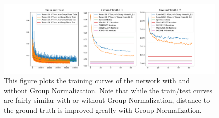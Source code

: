 \documentclass[10pt,twocolumn,letterpaper]{article}
\begin{document}
\begin{figure}[!hb]
\begin{center}
  \includegraphics[width=0.8\linewidth]{figures-GroupNormTest.pdf}
\end{center}
  \caption{
    This figure plots the training curves of the network with and without Group Normalization.
    Note that while the train/test curves are fairly similar with or without Group Normalization, distance to the ground truth is improved greatly with Group Normalization.
  }
\label{fig:groupnorm}
\label{fig:onecol}
\end{figure}
\end{document}
